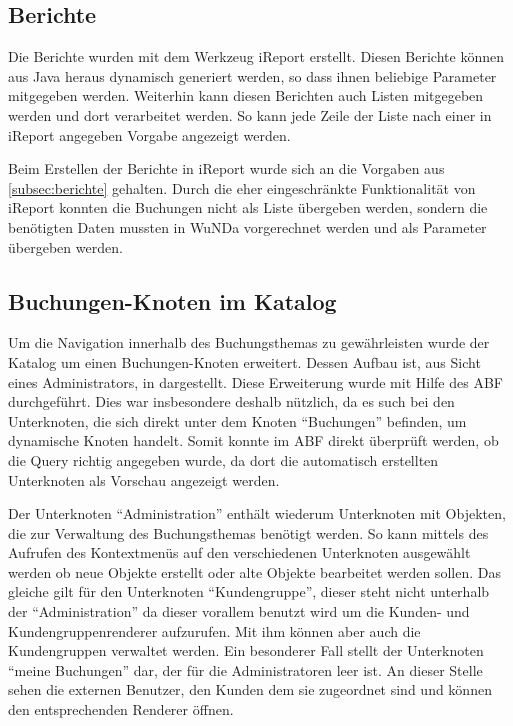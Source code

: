 \subsection{Berichte}
Die Berichte wurden mit dem Werkzeug iReport erstellt. Diesen Berichte können aus Java heraus dynamisch generiert werden, so dass ihnen beliebige Parameter mitgegeben werden.
Weiterhin kann diesen Berichten auch Listen mitgegeben werden und dort verarbeitet werden.
So kann jede Zeile der Liste nach einer in iReport angegeben Vorgabe angezeigt werden.

Beim Erstellen der Berichte in iReport wurde sich an die Vorgaben aus \autoref{subsec:berichte} gehalten.
Durch die eher eingeschränkte Funktionalität von iReport konnten die Buchungen nicht als Liste übergeben werden, sondern die benötigten Daten mussten in \ac{WuNDa} vorgerechnet werden und als Parameter übergeben werden.

\subsection{Buchungen-Knoten im Katalog}
Um die Navigation innerhalb des Buchungsthemas zu gewährleisten wurde der Katalog um einen Buchungen-Knoten erweitert.
Dessen Aufbau ist, aus Sicht eines Administrators, in  dargestellt.
Diese Erweiterung wurde mit Hilfe des \ac{ABF} durchgeführt.
Dies war insbesondere deshalb nützlich, da es such bei den Unterknoten, die sich direkt unter dem Knoten "`Buchungen"' befinden, um dynamische Knoten handelt.
Somit konnte im \ac{ABF} direkt überprüft werden, ob die Query richtig angegeben wurde, da dort die automatisch erstellten Unterknoten als Vorschau angezeigt werden.

Der Unterknoten "`Administration"' enthält wiederum Unterknoten mit Objekten, die zur Verwaltung des Buchungsthemas benötigt werden.
So kann mittels des Aufrufen des Kontextmenüs auf den verschiedenen Unterknoten ausgewählt werden ob neue Objekte erstellt oder alte Objekte bearbeitet werden sollen.
Das gleiche gilt für den Unterknoten "`Kundengruppe"', dieser steht nicht unterhalb der "`Administration"' da dieser vorallem benutzt wird um die Kunden- und Kundengruppenrenderer aufzurufen. Mit ihm können aber auch die Kundengruppen verwaltet werden.
Ein besonderer Fall stellt der Unterknoten "`meine Buchungen"' dar, der für die Administratoren leer ist.
An dieser Stelle sehen die externen Benutzer, den Kunden dem sie zugeordnet sind und können den entsprechenden Renderer öffnen. 

